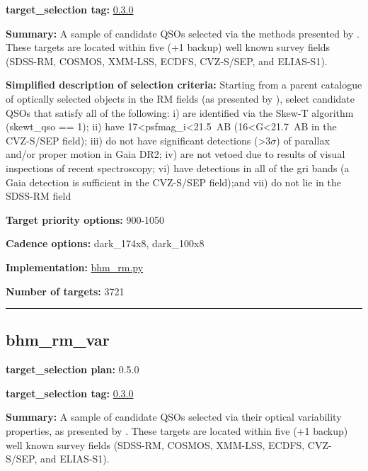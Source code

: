 \noindent\textbf{target\_selection tag:}
\href{https://github.com/sdss/target_selection/tree/0.3.0/}{0.3.0}

\noindent\textbf{Summary:} A sample of candidate QSOs selected via the methods
presented by
\citet{Yang2022}. These targets are located within five (+1 backup) well
known survey fields (SDSS-RM, COSMOS, XMM-LSS, ECDFS, CVZ-S/SEP, and
ELIAS-S1).

\noindent\textbf{Simplified description of selection criteria:} Starting from a
parent catalogue of optically selected objects in the RM fields (as
presented by
\citealt{Yang2022}), select candidate QSOs that satisfy all of the
following: i) are identified via the Skew-T algorithm (skewt\_qso == 1);
ii) have 17\textless psfmag\_i\textless21.5~AB
(16\textless G\textless21.7~AB in the CVZ-S/SEP field); iii) do not have
significant detections (\textgreater3$\sigma$) of parallax and/or proper motion
in Gaia DR2; iv) are not vetoed due to results of visual inspections of
recent spectroscopy; vi) have detections in all of the gri bands (a Gaia
detection is sufficient in the CVZ-S/SEP field);and vii) do not lie in
the SDSS-RM field


\noindent\textbf{Target priority options:} 900-1050

\noindent\textbf{Cadence options:} dark\_174x8, dark\_100x8

\noindent\textbf{Implementation:}
\href{https://github.com/sdss/target_selection/blob/0.3.0/python/target_selection/cartons/bhm_rm.py}{bhm\_rm.py}

\noindent\textbf{Number of targets:} 3721

\begin{center}\rule{0.5\linewidth}{0.5pt}\end{center}

\hypertarget{bhm_rm_var_plan0.5.0}{%
\subsection{bhm\_rm\_var}\label{bhm_rm_var_plan0.5.0}}

\noindent\textbf{target\_selection plan:} 0.5.0

\noindent\textbf{target\_selection tag:}
\href{https://github.com/sdss/target_selection/tree/0.3.0/}{0.3.0}

\noindent\textbf{Summary:} A sample of candidate QSOs selected via their optical
variability properties, as presented by
\citet{Yang2022}. These targets are located within five (+1 backup) well
known survey fields (SDSS-RM, COSMOS, XMM-LSS, ECDFS, CVZ-S/SEP, and
ELIAS-S1).

